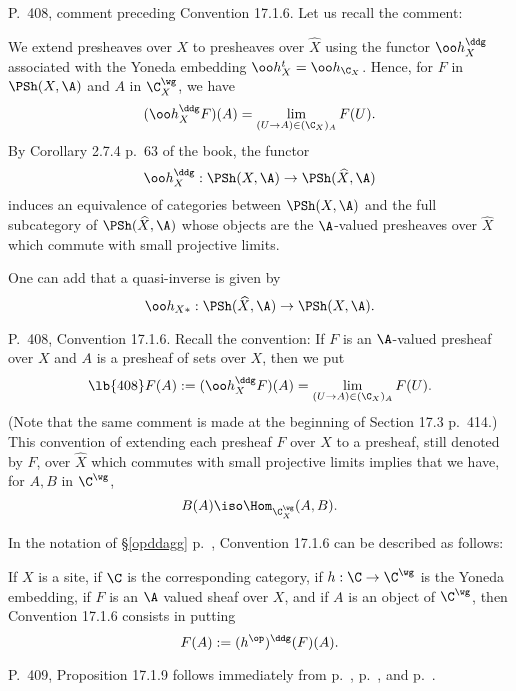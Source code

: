 \documentclass[12pt]{article}
\theoremstyle{remark}
\theoremstyle{definition}
\begin{document}
%

\begin{s}
P.~408, comment preceding Convention 17.1.6. Let us recall the comment: 

We extend presheaves over $X$ to presheaves over $\widehat X$ using the functor $\oo h_X^\ddg$ associated with the Yoneda embedding $\oo h_X^t=\oo h_{\C_X}$. Hence, for $F$ in $\PSh(X,\A)$ and $A$ in $\C_X^\wg$, we have 
$$
(\oo h_X^\ddg F)(A)=\lim_{(U\to A)\in(\C_X)_A}F(U).
$$ 
By Corollary 2.7.4 p.~63 of the book, the functor 
$$
\oo h_X^\ddg:\PSh(X,\A)\to\PSh(\widehat X,\A)
$$ 
induces an equivalence of categories between $\PSh(X,\A)$ and the full subcategory of $\PSh(\widehat X,\A)$ whose objects are the $\A$-valued presheaves over $\widehat X$ which commute with small projective limits. 

One can add that a quasi-inverse is given by 
$$
\oo h_{X*}:\PSh(\widehat X,\A)\to\PSh(X,\A). 
$$ 
\end{s}

%

\begin{s}
P.~408, Convention 17.1.6. Recall the convention: If $F$ is an $\A$-valued presheaf over $X$ and $A$ is a presheaf of sets over $X$, then we put 
%
\begin{equation}\lb{408}
F(A):=(\oo h_X^\ddg F)(A)=\lim_{(U\to A)\in(\C_X)_A}F(U).
\end{equation}
% 
(Note that the same comment is made at the beginning of Section 17.3 p.~414.) This convention of extending each presheaf $F$ over $X$ to a presheaf, still denoted by $F$, over $\widehat X$ which commutes with small projective limits implies that we have, for $A,B$ in $\C^\wg$, 
$$
B(A)\iso\Hom_{\C_X^\wg}(A,B).
$$ 

In the notation of \S\ref{opddagg} p.~, Convention 17.1.6 can be described as follows:

If $X$ is a site, if $\C$ is the corresponding category, if $h:\C\to\C^\wg$ is the Yoneda embedding, if $F$ is an $\A$ valued sheaf over $X$, and if $A$ is an object of $\C^\wg$, then Convention 17.1.6 consists in putting 
$$
F(A):=(h^{\op})^\ddg(F)(A).
$$ 
\end{s}

%

\begin{s}
P.~409, Proposition 17.1.9 follows immediately from  p.~,  p.~, and  p.~.
\end{s}
\end{document}
